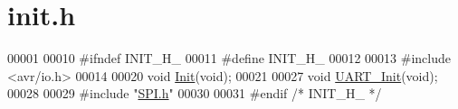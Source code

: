 \hypertarget{init_8h_source}{}\section{init.\+h}
\label{init_8h_source}

\begin{DoxyCode}
00001 
00010 \textcolor{preprocessor}{#ifndef INIT\_H\_}
00011 \textcolor{preprocessor}{#define INIT\_H\_}
00012 
00013 \textcolor{preprocessor}{#include <avr/io.h>}
00014 
00020 \textcolor{keywordtype}{void} \hyperlink{init_8h_a7ce0a14b6e7779fbb2d9a05333792c41}{Init}(\textcolor{keywordtype}{void});
00021 
00027 \textcolor{keywordtype}{void} \hyperlink{init_8h_ad5cbed2a2222bb84e8b5c1caaa50634e}{UART\_Init}(\textcolor{keywordtype}{void});
00028 
00029 \textcolor{preprocessor}{#include "\hyperlink{_s_p_i_8h}{SPI.h}"}
00030 
00031 \textcolor{preprocessor}{#endif }\textcolor{comment}{/* INIT\_H\_ */}\textcolor{preprocessor}{}
\end{DoxyCode}
